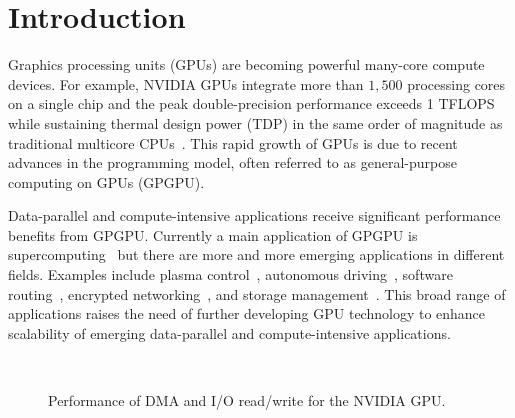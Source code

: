 \section{Introduction}
\label{sec:introduction}

Graphics processing units (GPUs) are becoming powerful many-core compute
devices.
For example, NVIDIA GPUs integrate more than $1,500$ processing cores on
a single chip and the peak double-precision performance exceeds 1
TFLOPS while sustaining thermal design power (TDP) in the same order of
magnitude as traditional multicore CPUs~\cite{NVIDIA_Kepler}. 
This rapid growth of GPUs is due to recent advances in the
programming model, often referred to as general-purpose computing on
GPUs (GPGPU).

Data-parallel and compute-intensive applications receive significant
performance benefits from GPGPU.
Currently a main application of GPGPU is supercomputing~\cite{TOP500}
but there are more and more emerging applications in different fields.
Examples include plasma control~\cite{Kato_ICCPS13}, autonomous
driving~\cite{McNaughton_ICRA11}, software routing~\cite{Han_SIGCOMM10},
encrypted networking~\cite{Jang_NSDI11}, and storage
management~\cite{Bhatotia_FAST12, Gharaibeh_HPDC10, Kato_ATC12,
Sun_SYSTOR12}.
This broad range of applications raises the need of further developing
GPU technology to enhance scalability of emerging data-parallel and
compute-intensive applications.

\begin{figure}[!t]
 \centering
 \\
 \caption{Performance of DMA and I/O read/write for the NVIDIA GPU.}
 \label{fig:intro_data_transfer}
\end{figure}

